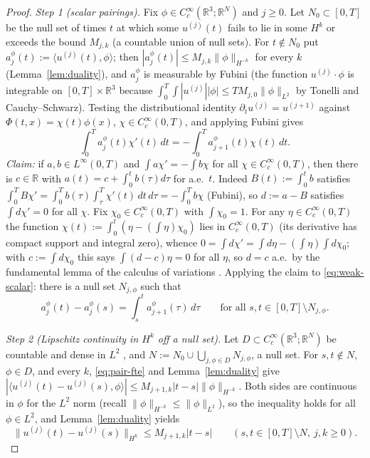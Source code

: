 \documentclass[11pt]{article}
\theoremstyle{definition}
\theoremstyle{plain}
\newcommand{\R}{\mathbb R}
\newcommand{\norm}[1]{\lVert #1\rVert}
\begin{document}
\begin{proof}
\emph{Step 1 (scalar pairings).}  Fix $\phi\in C_c^\infty(\R^3;\R^N)$ and
$j\geq0$.  Let $N_0\subset[0,T]$ be the null set of times $t$ at which
some $u^{(j)}(t)$ fails to lie in some $H^k$ or exceeds the bound
$M_{j,k}$ (a countable union of null sets).  For $t\notin N_0$ put
$a_j^\phi(t):=\langle u^{(j)}(t),\phi\rangle$; then $|a_j^\phi(t)|\leq
M_{j,k}\norm\phi_{H^{-k}}$ for every $k$ (Lemma~\ref{lem:duality}), and
$a_j^\phi$ is measurable by Fubini (the function $u^{(j)}\cdot\phi$ is
integrable on $[0,T]\times\R^3$ because $\int_0^T\int|u^{(j)}||\phi|
\leq TM_{j,0}\norm\phi_{L^2}$ by Tonelli and Cauchy--Schwarz).  Testing
the distributional identity $\partial_tu^{(j)}=u^{(j+1)}$ against
$\Phi(t,x)=\chi(t)\phi(x)$, $\chi\in C_c^\infty(0,T)$, and applying
Fubini gives
\begin{equation}\label{eq:weak-scalar}
 \int_0^Ta_j^\phi(t)\chi'(t)\,dt=-\int_0^Ta_{j+1}^\phi(t)\chi(t)\,dt .
\end{equation}
\emph{Claim:} if $a,b\in L^\infty(0,T)$ and $\int a\chi'=-\int b\chi$ for
all $\chi\in C_c^\infty(0,T)$, then there is $c\in\R$ with
$a(t)=c+\int_0^tb(\tau)d\tau$ for a.e.\ $t$.  Indeed $B(t):=\int_0^tb$
satisfies $\int_0^TB\chi'=\int_0^Tb(\tau)\int_\tau^T\chi'(t)\,dt\,d\tau
=-\int_0^Tb\chi$ (Fubini), so $d:=a-B$ satisfies $\int d\chi'=0$ for all
$\chi$.  Fix $\chi_0\in C_c^\infty(0,T)$ with $\int\chi_0=1$.  For any
$\eta\in C_c^\infty(0,T)$ the function $\chi(t):=\int_0^t(\eta-
(\int\eta)\chi_0)$ lies in $C_c^\infty(0,T)$ (its derivative has compact
support and integral zero), whence $0=\int d\chi'=\int d\eta-
(\int\eta)\int d\chi_0$; with $c:=\int d\chi_0$ this says
$\int(d-c)\eta=0$ for all $\eta$, so $d=c$ a.e.\ by the fundamental lemma
of the calculus of variations \cite[Ch.~7]{Rudin1987}.  Applying the claim
to \eqref{eq:weak-scalar}: there is a null set $N_{j,\phi}$ such that
\begin{equation}\label{eq:pair-fte}
 a_j^\phi(t)-a_j^\phi(s)=\int_s^ta_{j+1}^\phi(\tau)\,d\tau
 \qquad\text{for all }s,t\in[0,T]\setminus N_{j,\phi}.
\end{equation}

\emph{Step 2 (Lipschitz continuity in $H^k$ off a null set).}  Let
$D\subset C_c^\infty(\R^3;\R^N)$ be countable and dense in $L^2$
\cite[Ch.~3]{Rudin1987}, and $N:=N_0\cup\bigcup_{j,\phi\in D}N_{j,\phi}$,
a null set.  For $s,t\notin N$, $\phi\in D$, and every $k$,
\eqref{eq:pair-fte} and Lemma~\ref{lem:duality} give
$|\langle u^{(j)}(t)-u^{(j)}(s),\phi\rangle|\leq
M_{j+1,k}|t-s|\norm\phi_{H^{-k}}$.  Both sides are continuous in $\phi$
for the $L^2$ norm (recall $\norm\phi_{H^{-k}}\leq\norm\phi_{L^2}$), so
the inequality holds for all $\phi\in L^2$, and Lemma~\ref{lem:duality}
yields
\begin{equation}\label{eq:lip-offN}
 \norm{u^{(j)}(t)-u^{(j)}(s)}_{H^k}\leq M_{j+1,k}|t-s|
 \qquad(s,t\in[0,T]\setminus N,\ j,k\geq0).
\end{equation}


\end{proof}
\end{document}
